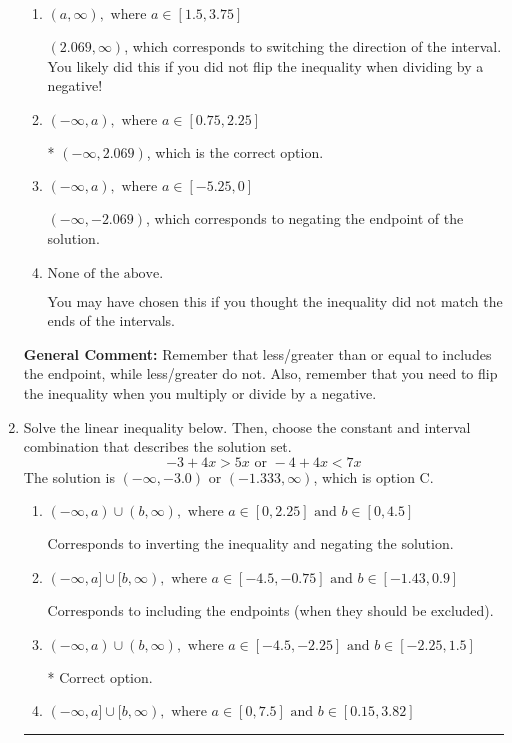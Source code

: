\documentclass{extbook}[14pt]
\newcommand{\litem}[1]{\item #1

\rule{\textwidth}{0.4pt}}
\begin{document}
\begin{enumerate}
{\begin{enumerate}[label=\Alph*.]
 $(-2.069, \infty)$, which corresponds to switching the direction of the interval AND negating the endpoint. You likely did this if you did not flip the inequality when dividing by a negative as well as not moving values over to a side properly.
\item \( (a, \infty), \text{ where } a \in [1.5, 3.75] \)

 $(2.069, \infty)$, which corresponds to switching the direction of the interval. You likely did this if you did not flip the inequality when dividing by a negative!
\item \( (-\infty, a), \text{ where } a \in [0.75, 2.25] \)

* $(-\infty, 2.069)$, which is the correct option.
\item \( (-\infty, a), \text{ where } a \in [-5.25, 0] \)

 $(-\infty, -2.069)$, which corresponds to negating the endpoint of the solution.
\item \( \text{None of the above}. \)

You may have chosen this if you thought the inequality did not match the ends of the intervals.
\end{enumerate}

\textbf{General Comment:} Remember that less/greater than or equal to includes the endpoint, while less/greater do not. Also, remember that you need to flip the inequality when you multiply or divide by a negative.
}
\litem{
Solve the linear inequality below. Then, choose the constant and interval combination that describes the solution set.
\[ -3 + 4 x > 5 x \text{ or } -4 + 4 x < 7 x \]The solution is \( (-\infty, -3.0) \text{ or } (-1.333, \infty) \), which is option C.\begin{enumerate}[label=\Alph*.]
\item \( (-\infty, a) \cup (b, \infty), \text{ where } a \in [0, 2.25] \text{ and } b \in [0, 4.5] \)

Corresponds to inverting the inequality and negating the solution.
\item \( (-\infty, a] \cup [b, \infty), \text{ where } a \in [-4.5, -0.75] \text{ and } b \in [-1.43, 0.9] \)

Corresponds to including the endpoints (when they should be excluded).
\item \( (-\infty, a) \cup (b, \infty), \text{ where } a \in [-4.5, -2.25] \text{ and } b \in [-2.25, 1.5] \)

 * Correct option.
\item \( (-\infty, a] \cup [b, \infty), \text{ where } a \in [0, 7.5] \text{ and } b \in [0.15, 3.82] \)


\end{enumerate}}
\end{enumerate}
\end{document}
